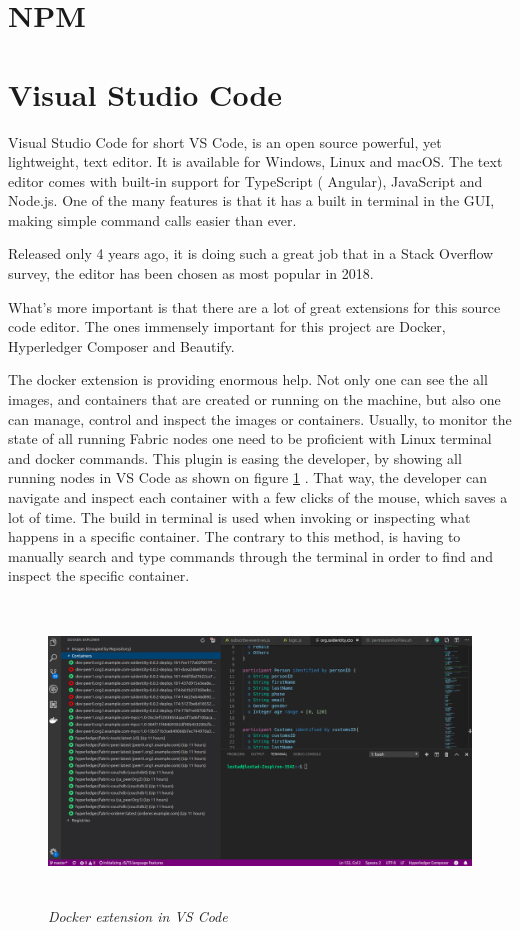 \documentclass[a4paper,11pt]{report}
\begin{document}
\section{NPM}

\section{Visual Studio Code}
\label{vsCode}

Visual Studio Code for short VS Code, is an open source powerful, yet lightweight, text editor. It is available for Windows, Linux and macOS. The text editor comes with built-in support for TypeScript ( Angular), JavaScript and Node.js. One of the many features is that it has a built in terminal in the GUI, making simple command calls easier than ever.

Released only 4 years ago, it is doing such a great job that in a Stack Overflow survey, the editor has been chosen as most popular in 2018.\cite{stackoverflow}

What's more important is that there are a lot of great extensions for this source code editor. The ones immensely important for this project are Docker, Hyperledger Composer and Beautify. 

The docker extension is providing enormous help. Not only one can see the all images, and containers that are created or running on the machine, but also one can manage, control and inspect the images or containers. Usually, to monitor the state of all running Fabric nodes one need to be proficient with Linux terminal and docker commands. This plugin is easing the developer, by showing all running nodes in VS Code as shown on figure \ref{vscode} . That way, the developer can navigate and inspect each container with a few clicks of the mouse, which saves a lot of time. The build in terminal is used when invoking or inspecting what happens in a specific container. The contrary to this method, is having to manually search and type commands through the terminal in order to find and inspect the specific container. 

\begin{figure}[h]
\centering
  \includegraphics[height=8cm,width=16cm]{vscode.png}
  \caption{\textit{Docker extension in VS Code}}
  \label{vscode}
\end{figure}
\end{document}
